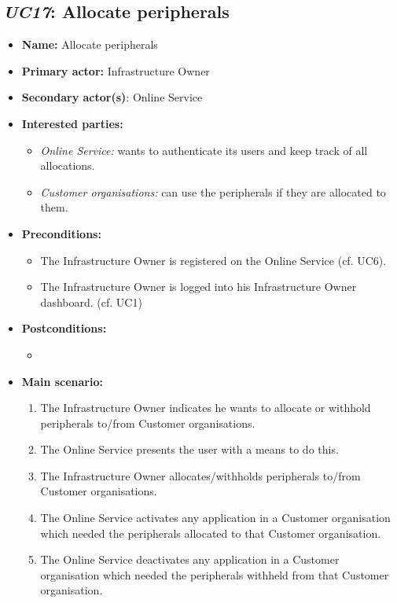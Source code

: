 \documentclass[english]{sareport}
\begin{document}
\subsection{\emph{UC17}: Allocate peripherals}
\begin{itemize}
    \item \textbf{Name:} Allocate peripherals
    \item \textbf{Primary actor:} Infrastructure Owner
    \item \textbf{Secondary actor(s)}: Online Service
    \item \textbf{Interested parties:} 
        \begin{itemize}
             \item \textit{Online Service:}  wants to authenticate its users and keep track of all allocations.
             \item \textit{Customer organisations: } can use the peripherals if they are allocated to them.
        \end{itemize}

    \item \textbf{Preconditions:}
        \begin{itemize}
            \item The Infrastructure Owner is registered on the Online Service (cf. UC6).
            \item The Infrastructure Owner is logged into his Infrastructure Owner dashboard. (cf. UC1)
        \end{itemize}

    \item \textbf{Postconditions:}
        \begin{itemize}
            \item
        \end{itemize}

        
    \item \textbf{Main scenario:} 
    \begin{enumerate}
       \item The Infrastructure Owner indicates he wants to allocate or withhold peripherals to/from Customer organisations.
       \item The Online Service presents the user with a means to do this.
       \item The Infrastructure Owner allocates/withholds peripherals to/from Customer organisations.
       \item The Online Service activates any application in a Customer organisation which needed the peripherals allocated to that Customer organisation.
       \item The Online Service deactivates any application in a Customer organisation which needed the peripherals withheld from that Customer organisation.
    \end{enumerate}
\end{itemize}
\end{document}
